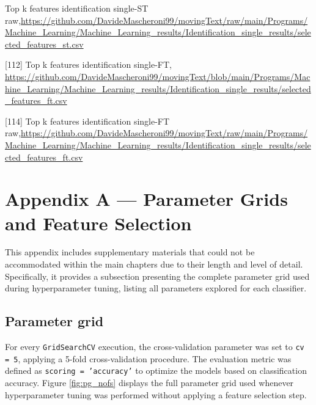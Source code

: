 \documentclass{article}
\begin{document}
\begin{raggedright}
[111] Top k features identification single-ST raw,\url{https://github.com/DavideMascheroni99/movingText/raw/main/Programs/Machine_Learning/Machine_Learning_results/Identification_single_results/selected_features_st.csv}

[112] Top k features identification single-FT, \url{https://github.com/DavideMascheroni99/movingText/blob/main/Programs/Machine_Learning/Machine_Learning_results/Identification_single_results/selected_features_ft.csv}

[114] Top k features identification single-FT raw,\url{https://github.com/DavideMascheroni99/movingText/raw/main/Programs/Machine_Learning/Machine_Learning_results/Identification_single_results/selected_features_ft.csv}

\end{raggedright}


\clearpage

\appendix
\section{Appendix A — Parameter Grids and Feature Selection}
\label{subsec:param}

This appendix includes supplementary materials that could not be accommodated within the main chapters due to their length and level of detail. 
Specifically, it provides a subsection presenting the complete parameter grid used during hyperparameter tuning, listing all parameters explored for each classifier. 

\subsection{Parameter grid}
For every \texttt{GridSearchCV} execution, the cross-validation parameter was set to \texttt{cv = 5}, applying a 5-fold cross-validation procedure.
The evaluation metric was defined as \texttt{scoring = 'accuracy'} to optimize the models based on classification accuracy.
Figure \ref{fig:pg_nofs} displays the full parameter grid used whenever hyperparameter tuning was performed without applying a feature selection step.
\end{document}
